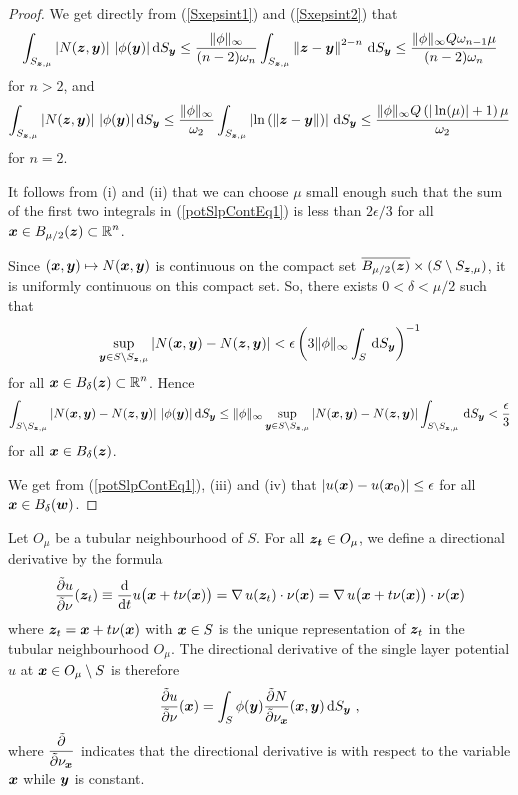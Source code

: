 \begin{proof}
 We get directly from (\ref{Sxepsint1}) and
(\ref{Sxepsint2}) that
\[
\int_{S_{\VEC{z},\mu}} \left| N(\VEC{z},\VEC{y}) \right|\,
|\phi(\VEC{y})| \dss{S}{y}
\leq \frac{\|\phi\|_\infty}{(n-2)\omega_n} 
\int_{S_{\VEC{z},\mu}} \left\|\VEC{z} -\VEC{y} \right\|^{2-n} \dss{S}{y}
\leq \frac{\|\phi\|_\infty Q \omega_{n-1} \mu}{(n-2)\omega_n} 
\]
for $n>2$, and
\[
\int_{S_{\VEC{z},\mu}} \left| N(\VEC{z},\VEC{y}) \right|\,
|\phi(\VEC{y})| \dss{S}{y}
\leq \frac{\|\phi\|_\infty}{\omega_2} 
\int_{S_{\VEC{z},\mu}} \left| \ln\left(
\left\|\VEC{z} -\VEC{y} \right\| \right)\right|  \dss{S}{y}
\leq \frac{ \|\phi\|_\infty Q \left(|\ln(\mu)|+1\right)\mu}{\omega_2} 
\]
for $n= 2$.

  It follows from (i) and (ii) that we can choose $\mu$
small enough such that the sum of the first two integrals
in (\ref{potSlpContEq1}) is less than $2\epsilon/3$ for all
$\displaystyle \VEC{x} \in B_{\mu/2}(\VEC{z}) \subset \RR^n$.

Since $(\VEC{x},\VEC{y}) \mapsto N(\VEC{x},\VEC{y})$ is continuous on
the compact set
$\overline{B_{\mu/2}(\VEC{z})} \times (S \setminus S_{\VEC{z},\mu})$,
it is uniformly continuous on this compact set.  So, there exists
$0 < \delta < \mu/2$ such that
\[
\sup_{\VEC{y} \in S \setminus S_{\VEC{z},\mu}}
\left| N(\VEC{x},\VEC{y}) - N(\VEC{z},\VEC{y}) \right| <
\epsilon\left( 3\|\phi\|_\infty \int_S \dss{S}{y}\right)^{-1}
\]
for all $\displaystyle \VEC{x} \in B_\delta(\VEC{z}) \subset \RR^n$.
Hence
\[
\int_{S \setminus S_{\VEC{z},\mu}}
\left| N(\VEC{x},\VEC{y}) - N(\VEC{z},\VEC{y}) \right|
\,|\phi(\VEC{y}) |\dss{S}{y}
\leq \|\phi\|_\infty \sup_{\VEC{y} \in S \setminus S_{\VEC{z},\mu}}
\left| N(\VEC{x},\VEC{y}) - N(\VEC{z},\VEC{y}) \right| 
\int_{S \setminus S_{\VEC{z},\mu}} \dss{S}{y}
< \frac{\epsilon}{3}
\]
for all $\VEC{x} \in B_\delta(\VEC{z})$.

 We get from (\ref{potSlpContEq1}), (iii) and (iv) that
$\displaystyle \left| u(\VEC{x}) - u(\VEC{x}_0) \right| \leq \epsilon$ for all
$\VEC{x} \in B_\delta(\VEC{w})$.
\end{proof}

Let $O_\mu$ be a tubular neighbourhood of $S$.  For all
$\VEC{z_t} \in O_\mu$, we define a directional derivative by the formula
\[
\pdydxS{u}{\nu}(\VEC{z}_t)
\equiv \dfdx{u\big(\VEC{x}+t\nu(\VEC{x})\big)}{t}
= \graD u(\VEC{z}_t) \cdot \nu(\VEC{x})
= \graD u\big(\VEC{x}+t\nu(\VEC{x})\big) \cdot \nu(\VEC{x})
\]
where $\VEC{z}_t = \VEC{x} + t\nu(\VEC{x})$ with $\VEC{x} \in S$
is the unique representation of $\VEC{z}_t$ in the tubular neighbourhood
$O_\mu$.  The directional derivative of the single layer
potential $u$ at $\VEC{x}\in O_\mu \setminus S$ is
therefore
\[
\pdydxS{u}{\nu}(\VEC{x}) = \int_S 
 \phi(\VEC{y}) \pdydxS{N}{\nu_{\VEC{x}}}(\VEC{x},\VEC{y}) \dss{S}{y} \ ,
\]
where $\displaystyle \pdydxS{}{\nu_{\VEC{x}}}$ indicates that the
directional derivative is with respect to the variable $\VEC{x}$ while
$\VEC{y}$ is constant.


